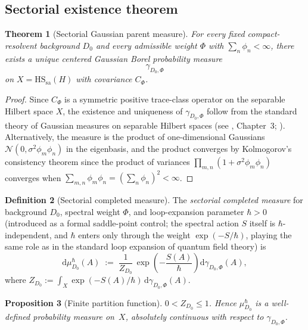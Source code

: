 \documentclass[12pt,a4paper]{article}
\theoremstyle{plain}
\newtheorem{theorem}{Theorem}[section]
\newtheorem{proposition}[theorem]{Proposition}
\theoremstyle{definition}
\newtheorem{definition}[theorem]{Definition}
\theoremstyle{remark}
\newcommand{\dd}{\mathrm{d}}
\newcommand{\HS}{\mathrm{HS}}
\newcommand{\sa}{\mathrm{sa}}
\begin{document}
\subsection{Sectorial existence theorem}

\begin{theorem}[Sectorial Gaussian parent measure]
\label{thm:sectorial-existence}
For every fixed compact-resolvent background $D_0$ and every admissible
weight $\Phi$ with $\sum_n \phi_n < \infty$, there exists a unique
centered Gaussian Borel probability measure
\begin{equation}
  \gamma_{D_0,\Phi}
\end{equation}
on $X = \HS_\sa(H)$ with covariance $C_\Phi$.
\end{theorem}

\begin{proof}
Since $C_\Phi$ is a symmetric positive trace-class operator on the
separable Hilbert space $X$, the existence and uniqueness of
$\gamma_{D_0,\Phi}$ follow from the standard theory of Gaussian
measures on separable Hilbert spaces
(see \cite{Bogachev:1998}, Chapter~3; \cite{Kuo:1975}).  Alternatively,
the measure is the product of one-dimensional Gaussians
$\mathcal{N}(0, \sigma^2\phi_m\phi_n)$ in the eigenbasis, and the
product converges by Kolmogorov's consistency theorem since the
product of variances $\prod_{m,n}(1 + \sigma^2\phi_m\phi_n)$ converges
when $\sum_{m,n}\phi_m\phi_n = (\sum_n \phi_n)^2 < \infty$.
\end{proof}

\begin{definition}[Sectorial completed measure]
\label{def:completed-measure}
The \emph{sectorial completed measure} for background $D_0$, spectral
weight $\Phi$, and loop-expansion parameter $\hbar > 0$
(introduced as a formal saddle-point control; the spectral action
$S$ itself is $\hbar$-independent, and $\hbar$ enters only through
the weight $\exp(-S/\hbar)$, playing the same role as in the
standard loop expansion of quantum field theory) is
\begin{equation}\label{eq:completed-measure}
  \dd\mu_{D_0}^\hbar(A)
  \;:=\;
  \frac{1}{Z_{D_0}}\,
  \exp\!\left(-\frac{S(A)}{\hbar}\right)
  \dd\gamma_{D_0,\Phi}(A),
\end{equation}
where $Z_{D_0} := \int_X \exp(-S(A)/\hbar)\,\dd\gamma_{D_0,\Phi}(A)$.
\end{definition}

\begin{proposition}[Finite partition function]
\label{prop:finite-Z}
$0 < Z_{D_0} \le 1$.  Hence $\mu_{D_0}^\hbar$ is a well-defined
probability measure on~$X$, absolutely continuous with respect to
$\gamma_{D_0,\Phi}$.
\end{proposition}
\end{document}
